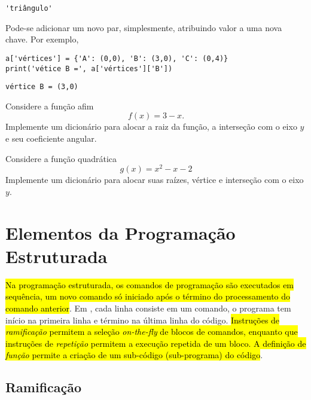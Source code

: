 \documentclass[12pt]{article}
\begin{document}
\begin{verbatim}
'triângulo'
\end{verbatim}

Pode-se adicionar um novo par, simplesmente, atribuindo valor a uma nova chave. Por exemplo,

\begin{lstlisting}
a['vértices'] = {'A': (0,0), 'B': (3,0), 'C': (0,4)}
print('vétice B =', a['vértices']['B'])
\end{lstlisting}

\begin{verbatim}
vértice B = (3,0)
\end{verbatim}


\begin{exr}
  Considere a função afim
  \begin{equation}
    f(x) = 3 - x.
  \end{equation}
  Implemente um dicionário para alocar a raiz da função, a interseção com o eixo $y$ e seu coeficiente angular.
\end{exr}

\begin{exr}
  Considere a função quadrática
  \begin{equation}
    g(x) = x^2 - x - 2
  \end{equation}
  Implemente um dicionário para alocar suas raízes, vértice e interseção com o eixo $y$.
\end{exr}


\section{Elementos da Programação Estruturada}\label{sec_progest}

\hl{Na programação estruturada, os comandos de programação são executados em sequência, um novo comando só iniciado após o término do processamento do comando anterior}. Em {\python}, cada linha consiste em um comando, o programa tem início na primeira linha e término na última linha do código. \hl{Instruções de \emph{ramificação} permitem a seleção \textit{on-the-fly} de blocos de comandos, enquanto que instruções de \emph{repetição} permitem a execução repetida de um bloco. A definição de \emph{função} permite a criação de um sub-código (sub-programa) do código}.

\subsection{Ramificação}
\end{document}

